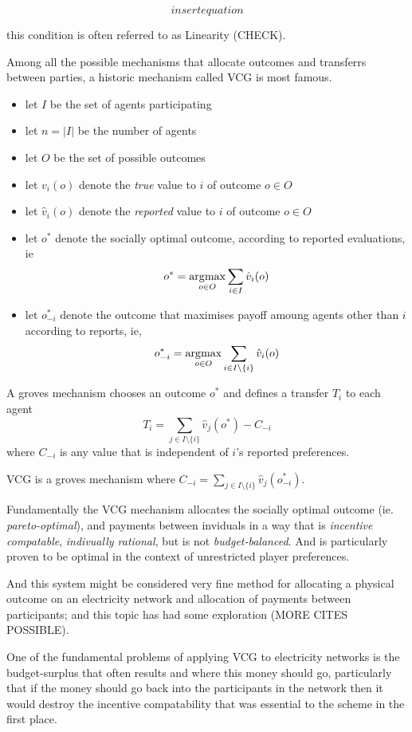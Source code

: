 $$insert equation$$

this condition is often referred to as Linearity (CHECK).

Among all the possible mechanisms that allocate outcomes and transferrs between parties, a historic mechanism called VCG is most famous.


\begin{itemize}
    \item let $I$ be the set of agents participating
    \item let $n=|I|$ be the number of agents
    \item let $O$ be the set of possible outcomes
    \item let $v_i(o)$ denote the \textit{true} value to $i$ of outcome $o\in O$
    \item let $\hat{v}_i(o)$ denote the \textit{reported} value to $i$ of outcome $o\in O$
    \item let $o^*$ denote the socially optimal outcome, according to reported evaluations, ie $$o^*=\operatorname*{\arg\!\max}_{o\in O}\sum_{i\in I}\hat{v}_i(o)$$
    \item let $o^*_{-i}$ denote the outcome that maximises payoff amoung agents other than $i$ according to reports, ie, $$o^*_{-i}=\operatorname*{\arg\!\max}_{o\in O}\sum_{i\in I\setminus\{i\}}\hat{v}_i(o)$$
\end{itemize}

A groves mechanism chooses an outcome $o^*$ and defines a transfer $T_i$ to each agent $$T_i=\sum_{j\in I\setminus\{i\}}\hat{v}_j(o^*) - C_{-i}$$
where $C_{-i}$ is any value that is independent of $i$'s reported preferences.

VCG is a groves mechanism where $C_{-i}=\sum_{j\in I\setminus\{i\}}\hat{v}_j(o^*_{-i})$.

Fundamentally the VCG mechanism allocates the socially optimal outcome (ie. \textit{pareto-optimal}), and payments between inviduals in a way that is \textit{incentive compatable}, \textit{indivually rational}, but is not \textit{budget-balanced}.
And is particularly proven to be optimal in the context of unrestricted player preferences.

And this system might be considered very fine method for allocating a physical outcome on an electricity network and allocation of payments between participants; and this topic has had some exploration \cite{SESSA2017189, 8264596} (MORE CITES POSSIBLE).

One of the fundamental problems of applying VCG to electricity networks is the budget-surplus that often results and where this money should go, particularly that if the money should go back into the participants in the network then it would destroy the incentive compatability that was essential to the scheme in the first place.

